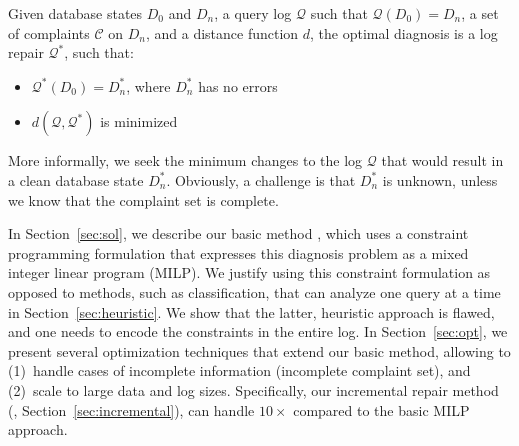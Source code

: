 \begin{definition}\label{def:problem}
    Given database states $D_0$ and $D_n$, a query log $\mathcal{Q}$ such that $\mathcal{Q}(D_0)=D_n$, a set of complaints $\mathcal{C}$ on $D_n$,  and a distance function $d$, the optimal diagnosis is a log repair $\mathcal{Q}^*$, such that:
    \begin{itemize}[itemsep=0pt, parsep=0pt]
        \item $\mathcal{Q}^*(D_0)=D_n^*$, where $D_n^*$ has no errors
        \item $d(\mathcal{Q}, \mathcal{Q}^*)$ is minimized
    \end{itemize}
\end{definition}

More informally, we seek the minimum changes to the log $\mathcal{Q}$
that would result in a clean database state $D_n^*$. Obviously, a
challenge is that $D_n^*$ is unknown, unless we know that the
complaint set is complete. 

In Section~\ref{sec:sol}, we describe our basic method \naive, which
uses a constraint programming formulation that expresses this
diagnosis problem as a mixed integer linear program (MILP). We justify
using this constraint formulation as opposed to methods, such as
classification, that can analyze one query at a time in
Section~\ref{sec:heuristic}. We show that the latter, heuristic
approach is flawed, and one needs to encode the constraints in the
entire log. In Section~\ref{sec:opt}, we present several optimization
techniques that extend our basic method, allowing \sys to (1)~handle
cases of incomplete information (incomplete complaint set), and
(2)~scale to large data and log sizes. Specifically, our incremental
repair method (\incremental, Section~\ref{sec:incremental}), can
handle $10\times$ compared to the basic MILP approach.





\fi




